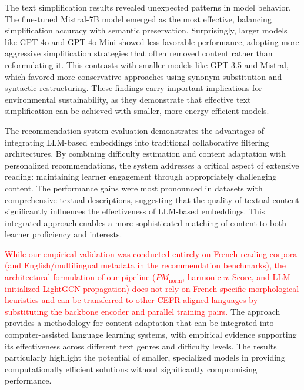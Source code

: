 The text simplification results revealed unexpected patterns in model behavior. The fine-tuned Mistral-7B model emerged as the most effective, balancing simplification accuracy with semantic preservation. Surprisingly, larger models like GPT-4o and GPT-4o-Mini showed less favorable performance, adopting more aggressive simplification strategies that often removed content rather than reformulating it. This contrasts with smaller models like GPT-3.5 and Mistral, which favored more conservative approaches using synonym substitution and syntactic restructuring. These findings carry important implications for environmental sustainability, as they demonstrate that effective text simplification can be achieved with smaller, more energy-efficient models.

The recommendation system evaluation demonstrates the advantages of integrating LLM-based embeddings into traditional collaborative filtering architectures. By combining difficulty estimation and content adaptation with personalized recommendations, the system addresses a critical aspect of extensive reading: maintaining learner engagement through appropriately challenging content. The performance gains were most pronounced in datasets with comprehensive textual descriptions, suggesting that the quality of textual content significantly influences the effectiveness of LLM-based embeddings. This integrated approach enables a more sophisticated matching of content to both learner proficiency and interests.

\textcolor{red}{While our empirical validation was conducted entirely on French reading corpora (and English/multilingual metadata in the recommendation benchmarks), the architectural formulation of our pipeline ($PM_{\text{norm}}$, harmonic $w\text{-Score}$, and LLM-initialized LightGCN propagation) does not rely on French-specific morphological heuristics and can be transferred to other CEFR-aligned languages by substituting the backbone encoder and parallel training pairs.} The approach provides a methodology for content adaptation that can be integrated into computer-assisted language learning systems, with empirical evidence supporting its effectiveness across different text genres and difficulty levels. The results particularly highlight the potential of smaller, specialized models in providing computationally efficient solutions without significantly compromising performance.

